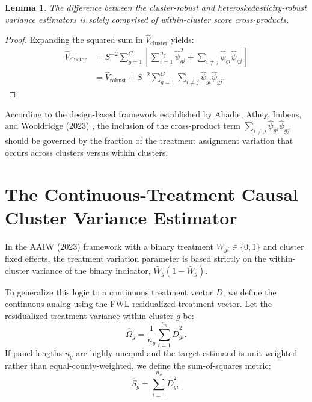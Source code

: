 \documentclass[11pt, letterpaper]{article}
\newtheorem{lemma}{Lemma}
\theoremstyle{remark}
\begin{document}
\begin{lemma}
The difference between the cluster-robust and heteroskedasticity-robust variance estimators is solely comprised of within-cluster score cross-products.
\end{lemma}
\begin{proof}
Expanding the squared sum in $\widehat V_{\text{cluster}}$ yields:
\begin{align*}
    \widehat V_{\text{cluster}} &= S^{-2} \sum_{g=1}^G \left[ \sum_{i=1}^{n_g}\widehat\psi_{gi}^2 + \sum_{i\neq j} \widehat\psi_{gi}\widehat\psi_{gj} \right] \\
    &= \widehat V_{\text{robust}} + S^{-2} \sum_{g=1}^G \sum_{i\neq j} \widehat\psi_{gi}\widehat\psi_{gj}.
\end{align*}
\end{proof}

According to the design-based framework established by Abadie, Athey, Imbens, and Wooldridge (2023) \cite{AAIW2023}, the inclusion of the cross-product term $\sum_{i \neq j} \widehat\psi_{gi}\widehat\psi_{gj}$ should be governed by the fraction of the treatment assignment variation that occurs across clusters versus within clusters.

\section{The Continuous-Treatment Causal Cluster Variance Estimator}

In the AAIW (2023) framework with a binary treatment $W_{gi} \in \{0,1\}$ and cluster fixed effects, the treatment variation parameter is based strictly on the within-cluster variance of the binary indicator, $\bar W_g(1-\bar W_g)$.

To generalize this logic to a continuous treatment vector $D$, we define the continuous analog using the FWL-residualized treatment vector. Let the residualized treatment variance within cluster $g$ be:
\begin{equation}
    \widehat\Omega_g = \frac{1}{n_g} \sum_{i=1}^{n_g} \widetilde D_{gi}^2.
\end{equation}
If panel lengths $n_g$ are highly unequal and the target estimand is unit-weighted rather than equal-county-weighted, we define the sum-of-squares metric:
\begin{equation}
    \widehat S_g = \sum_{i=1}^{n_g} \widetilde D_{gi}^2.
\end{equation}
\end{document}
